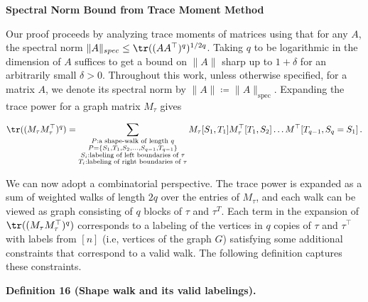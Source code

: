 \documentclass[10pt,a4paper]{article}
\begin{document}
\par\medskip\noindent\textbf{Spectral Norm Bound from Trace Moment Method}\par




Our proof proceeds by analyzing trace moments of matrices using that for any $A$, the spectral norm $\|A\|_{spec}\leq\tr((AA^{\top})^{q})^{1/2q}$. Taking $q$ to be logarithmic in the dimension of $A$ suffices to get a bound on $\|A\|$ sharp up to $1+\delta$ for an arbitrarily small $\delta>0$. Throughout this work, unless otherwise specified, for a matrix $A$, we denote its spectral norm by $\|A\|\coloneqq\|A\|_{\text{spec}}$. Expanding the trace power for a graph matrix $M_{\tau}$ gives\par




\[\begin{gathered}
\displaystyle\tr((M_{\tau}M_{\tau}^{\top})^{q}) \displaystyle=\sum_{\begin{subarray}{c}P:\text{a shape-walk of length }q\\
P=\{S_{1},T_{1},S_{2},\dots,S_{q-1},T_{q-1}\}\\
S_{i}:\text{labeling of left boundaries of $\tau$}\\
T_{i}:\text{labeling of right boundaries of $\tau$}\end{subarray}}M_{\tau}[S_{1},T_{1}]M_{\tau}^{\top}[T_{1},S_{2}]\dots M^{\top}[T_{q-1},S_{q}=S_{1}]\,.
\end{gathered}\]




We can now adopt a combinatorial perspective. The trace power is expanded as a sum of weighted walks of length $2q$ over the entries of $M_{\tau}$, and each walk can be viewed as graph consisting of $q$ blocks of $\tau$ and $\tau^{T}$. Each term in the expansion of $\tr((M_{\tau}M_{\tau}^{\top})^{q})$ corresponds to a labeling of the vertices in $q$ copies of $\tau$ and $\tau^{\top}$ with labels from $[n]$ (i.e, vertices of the graph $G$) satisfying some additional constraints that correspond to a valid walk. The following definition captures these constraints.\par





\par\medskip\noindent\textbf{
\textbf{Definition 16}\textbf{ }(Shape walk and its valid labelings)\textbf{.}
}\par
\end{document}
